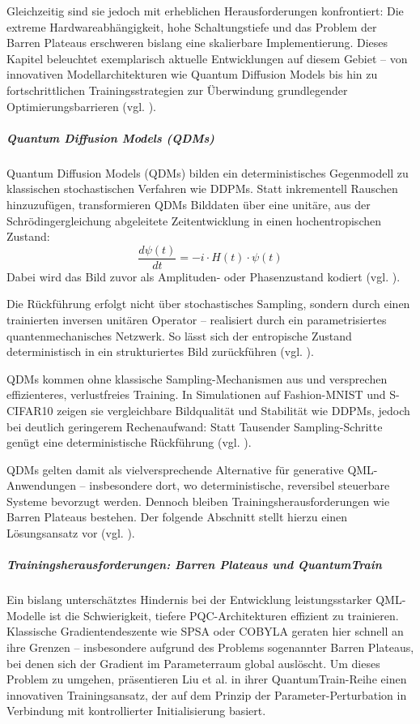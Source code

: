 Gleichzeitig sind sie jedoch mit erheblichen Herausforderungen konfrontiert: Die extreme Hardwareabhängigkeit, hohe Schaltungstiefe und das Problem der Barren Plateaus erschweren bislang eine skalierbare Implementierung. Dieses Kapitel beleuchtet exemplarisch aktuelle Entwicklungen auf diesem Gebiet – von innovativen Modellarchitekturen wie Quantum Diffusion Models bis hin zu fortschrittlichen Trainingsstrategien zur Überwindung grundlegender Optimierungsbarrieren (vgl. \cite{liuQTRLPracticalQuantum2024}).


\subparagraph{Quantum Diffusion Models (QDMs)}
Quantum Diffusion Models (QDMs) bilden ein deterministisches Gegenmodell zu klassischen stochastischen Verfahren wie DDPMs. Statt inkrementell Rauschen hinzuzufügen, transformieren QDMs Bilddaten über eine unitäre, aus der Schrödingergleichung abgeleitete Zeitentwicklung in einen hochentropischen Zustand:
\[
\frac{d\psi(t)}{dt} = -i \cdot H(t) \cdot \psi(t)
\]
Dabei wird das Bild zuvor als Amplituden- oder Phasenzustand kodiert (vgl. \cite{zhangGenerativeQuantumMachine2024}).

Die Rückführung erfolgt nicht über stochastisches Sampling, sondern durch einen trainierten inversen unitären Operator – realisiert durch ein parametrisiertes quantenmechanisches Netzwerk. So lässt sich der entropische Zustand deterministisch in ein strukturiertes Bild zurückführen (vgl. \cite{zhangGenerativeQuantumMachine2024}).

QDMs kommen ohne klassische Sampling-Mechanismen aus und versprechen effizienteres, verlustfreies Training. In Simulationen auf Fashion-MNIST und S-CIFAR10 zeigen sie vergleichbare Bildqualität und Stabilität wie DDPMs, jedoch bei deutlich geringerem Rechenaufwand: Statt Tausender Sampling-Schritte genügt eine deterministische Rückführung (vgl. \cite{zhangGenerativeQuantumMachine2024}).

QDMs gelten damit als vielversprechende Alternative für generative QML-Anwendungen – insbesondere dort, wo deterministische, reversibel steuerbare Systeme bevorzugt werden. Dennoch bleiben Trainingsherausforderungen wie Barren Plateaus bestehen. Der folgende Abschnitt stellt hierzu einen Lösungsansatz vor (vgl. \cite{zhangGenerativeQuantumMachine2024}).



\subparagraph{Trainingsherausforderungen: Barren Plateaus und QuantumTrain}
Ein bislang unterschätztes Hindernis bei der Entwicklung leistungsstarker QML-Modelle ist die Schwierigkeit, tiefere PQC-Architekturen effizient zu trainieren. Klassische Gradientendeszente wie SPSA oder COBYLA geraten hier schnell an ihre Grenzen – insbesondere aufgrund des Problems sogenannter Barren Plateaus, bei denen sich der Gradient im Parameterraum global auslöscht. Um dieses Problem zu umgehen, präsentieren Liu et al. \cite{liuQuantumTrainRethinkingHybrid2024} in ihrer QuantumTrain-Reihe einen innovativen Trainingsansatz, der auf dem Prinzip der Parameter-Perturbation in Verbindung mit kontrollierter Initialisierung basiert.

